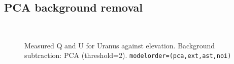 \documentclass[twoside,11pt]{starlink}
\begin{document}
\subsection{PCA background removal}

\begin{figure}[H]
\centering
{}
\hspace*{10pt}
\\
\caption{Measured Q and U for Uranus against elevation. Background
subtraction: PCA (threshold=2). \texttt{modelorder=(pca,ext,ast,noi)}}
\label{fig:urback4}
\end{figure}
\end{document}

